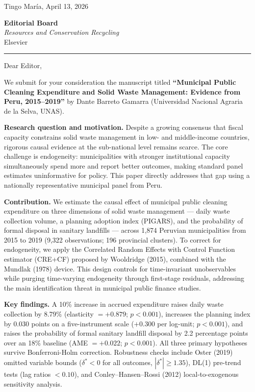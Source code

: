 \documentclass[12pt]{article}
\begin{document}
\singlespacing

Tingo Mar\'ia, April 13, 2026

\medskip

\textbf{Editorial Board}\\
\textit{Resources and Conservation Recycling}\\
Elsevier

\medskip
\noindent\rule{\linewidth}{0.4pt}
\medskip

Dear Editor,

We submit for your consideration the manuscript titled \textbf{``Municipal Public Cleaning Expenditure and Solid Waste Management: Evidence from Peru, 2015--2019''} by Dante Barreto Gamarra (Universidad Nacional Agraria de la Selva, UNAS).

\textbf{Research question and motivation.} Despite a growing consensus that fiscal capacity constrains solid waste management in low- and middle-income countries, rigorous causal evidence at the sub-national level remains scarce. The core challenge is endogeneity: municipalities with stronger institutional capacity simultaneously spend more and report better outcomes, making standard panel estimates uninformative for policy. This paper directly addresses that gap using a nationally representative municipal panel from Peru.

\textbf{Contribution.} We estimate the causal effect of municipal public cleaning expenditure on three dimensions of solid waste management --- daily waste collection volume, a planning adoption index (PIGARS), and the probability of formal disposal in sanitary landfills --- across 1,874 Peruvian municipalities from 2015 to 2019 (9,322 observations; 196 provincial clusters). To correct for endogeneity, we apply the Correlated Random Effects with Control Function estimator (CRE+CF) proposed by Wooldridge (2015), combined with the Mundlak (1978) device. This design controls for time-invariant unobservables while purging time-varying endogeneity through first-stage residuals, addressing the main identification threat in municipal public finance studies.

\textbf{Key findings.} A 10\% increase in accrued expenditure raises daily waste collection by 8.79\% (elasticity $= +0.879$; $p < 0.001$), increases the planning index by 0.030 points on a five-instrument scale ($+0.300$ per log-unit; $p < 0.001$), and raises the probability of formal sanitary landfill disposal by 2.2 percentage points over an 18\% baseline (AME $= +0.022$; $p < 0.001$). All three primary hypotheses survive Bonferroni-Holm correction. Robustness checks include Oster (2019) omitted variable bounds ($\delta^* < 0$ for all outcomes, $|\delta^*| \geq 1.35$), DL(1) pre-trend tests (lag ratios $< 0.10$), and Conley--Hansen--Rossi (2012) local-to-exogenous sensitivity analysis.
\end{document}

